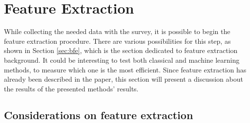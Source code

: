 \documentclass[conference]{IEEEtran}
\begin{document}
	\section{Feature Extraction\label{sec:fe}}

		\noindent While collecting the needed data with the survey, it is possible to begin the feature extraction procedure. There are various possibilities for this step, as shown in Section \ref{sec:bfe}, which is
		the section dedicated to feature extraction background. 
		It could be interesting to test both classical and machine learning methods, to measure which one is the most efficient. Since feature extraction has already been described in the paper, this section will 
		present a discussion about the results of the presented methods' results.

		\subsection{Considerations on feature extraction}
\end{document}
